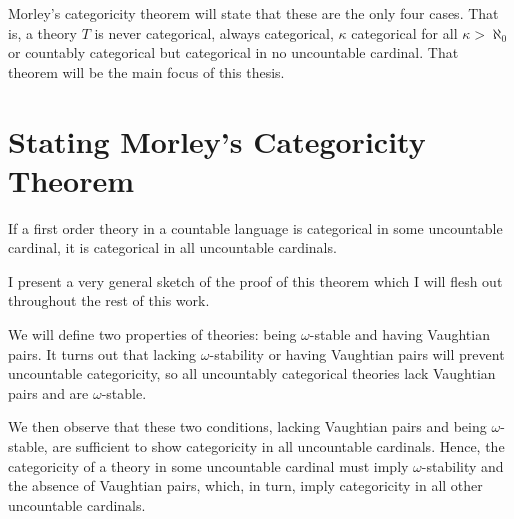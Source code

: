 Morley's categoricity theorem will state that these are the only four cases.
That is, a theory \(T\) is never categorical, always categorical, \(\kappa\) categorical for all \(\kappa > \aleph_0\) or countably categorical but categorical in no uncountable cardinal.  
That theorem will be the main focus of this thesis. 

\section{Stating Morley's Categoricity Theorem}

\begin{theorem}\label{theorem_morleys_categoricity}
If a first order theory in a countable language is categorical in some uncountable cardinal, it is categorical in all uncountable cardinals. 
\end{theorem}

I present a very general sketch of the proof of this theorem which I will flesh out throughout the rest of this work. 

We will define two properties of theories: being \(\omega\)-stable and having Vaughtian pairs. 
It turns out that lacking \(\omega\)-stability or having Vaughtian pairs will prevent uncountable categoricity, so all uncountably categorical theories lack Vaughtian pairs and are \(\omega\)-stable. 

We then observe that these two conditions, lacking Vaughtian pairs and being \(\omega\)-stable, are sufficient to show categoricity in all uncountable cardinals. 
Hence, the categoricity of a theory in some uncountable cardinal must imply \(\omega\)-stability and the absence of Vaughtian pairs, which, in turn, imply categoricity in all other uncountable cardinals.

